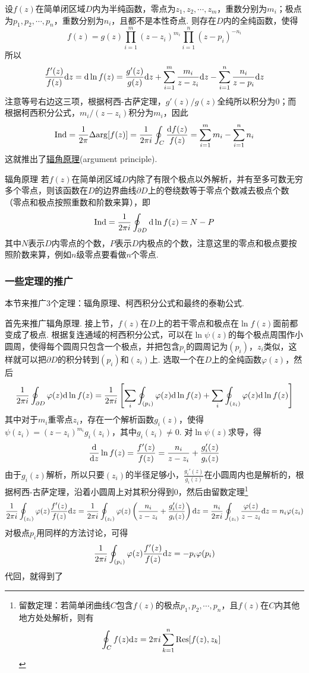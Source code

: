 \documentclass[main.tex]{subfiles}
\begin{document}
设\(f(z)\)在简单闭区域\(D\)内为半纯函数，零点为\(z_1,z_2,\cdots,z_m\)，重数分别为\(m_i\)；极点为\(p_1, p_2, \cdots, p_n\)，重数分别为\(n_i\)，且都不是本性奇点. 则存在\(D\)内的全纯函数，使得
\[f(z) = g(z)\prod_{i=1}^{m}(z-z_i)^{m_i}\prod_{i=1}^{n}(z-p_i)^{-n_i}\]
所以
\[\frac{f'(z)}{f(z)}{\rm d}z = {\rm d}\ln f(z) = \frac{g'(z)}{g(z)}{\rm d}z + \sum_{i=1}^{m}\frac{m_i}{z-z_i}{\rm d}z - \sum_{i=1}^{n} \frac{n_i}{z-p_i} {\rm d}z\]
注意等号右边这三项，根据柯西-古萨定理，\(g'(z)/g(z)\)全纯所以积分为\(0\)；而根据柯西积分公式，\(m_i/(z-z_i)\)积分为\(m_i\)，因此
\[{\rm Ind} = \frac{1}{2\pi}\Delta{\rm arg} [f(z)] = \frac{1}{2\pi i}\oint_{C}\frac{{\rm d}f(z)}{f(z)} = \sum_{i=1}^{m}m_i - \sum_{i=1}^{n}n_i\]
这就推出了\uline{辐角原理}(argument principle).

\begin{theorem}{辐角原理}
    若\(f(z)\)在简单闭区域\(D\)内除了有限个极点以外解析，并有至多可数无穷多个零点，则该函数在\(D\)的边界曲线\(\partial D\)上的卷绕数等于零点个数减去极点个数（零点和极点按照重数和阶数来算），即
    \[{\rm Ind} = \frac{1}{2\pi i}\oint_{\partial D}{\rm d}\ln f(z) = N-P\]
    其中\(N\)表示\(D\)内零点的个数，\(P\)表示\(D\)内极点的个数，注意这里的零点和极点要按照阶数来算，例如\(n\)级零点要看做\(n\)个零点.
\end{theorem}

\subsubsection{一些定理的推广}

本节来推广3个定理：辐角原理、柯西积分公式和最终的泰勒公式.

首先来推广辐角原理. 接上节，\(f(z)\)在\(D\)上的若干零点和极点在\(\ln f(z)\)面前都变成了极点. 根据复连通域的柯西积分公式，可以在\(\ln\psi(z)\)的每个极点周围作小圆周，使得每个圆周只包含一个极点，并把包含\(p_i\)的圆周记为\((p_i)\)，\(z_i\)类似，这样就可以把\(\partial D\)的积分转到\((p_i)\)和\((z_i)\)上. 选取一个在\(D\)上的全纯函数\(\varphi(z)\)，然后
\[\frac{1}{2\pi i}\oint_{\partial D}\varphi(z){\rm d}\ln f(z) = \frac{1}{2\pi i}\left[\sum_{i}\oint_{(p_i)}\varphi(z){\rm d}\ln f(z)+\sum_{i}\oint_{(z_i)}\varphi(z){\rm d}\ln f(z)\right]\]
其中对于\(m_i\)重零点\(z_i\)，存在一个解析函数\(g_i(z)\)，使得\(\psi(z_i) = (z-z_i)^{m_i}g_i(z_i)\)，其中\(g_i(z_i)\neq 0\). 对\(\ln\psi(z)\)求导，得
\[\frac{{\rm d}}{{\rm d}z}\ln f(z) = \frac{f'(z)}{f(z)} = \frac{n_i}{z-z_i}+\frac{g_i'(z)}{g_i(z)}\]
由于\(g_i(z)\)解析，所以只要\((z_i)\)的半径足够小，\(\frac{g_i'(z)}{g_i(z)}\)在小圆周内也是解析的，根据柯西-古萨定理，沿着小圆周上对其积分得到\(0\)，然后由留数定理\footnote{留数定理：若简单闭曲线\(C\)包含\(f(z)\)的极点\(p_1, p_2, \cdots, p_n\)，且\(f(z)\)在\(C\)内其他地方处处解析，则有
\[\oint_C f(z){\rm d}z = 2\pi i\sum_{k=1}^{n}{\rm Res}[f(z),z_k]\]}
\[\frac{1}{2\pi i}\oint_{(z_i)}\varphi(z)\frac{f'(z)}{f(z)}{\rm d}z = \frac{1}{2\pi i}\oint_{(z_i)}\varphi(z)\left(\frac{n_i}{z-z_i}+\frac{g_i'(z)}{g_i(z)}\right){\rm d}z = \frac{n_i}{2\pi i}\oint_{(z_i)}\frac{\varphi(z)}{z-z_i}{\rm d}z = n_i\varphi(z_i)\]
对极点\(p_i\)用同样的方法讨论，可得
\[\frac{1}{2 \pi i}\oint_{(p_i)}\varphi(z)\frac{f'(z)}{f(z)}{\rm d}z = -p_i\varphi(p_i)\]
代回，就得到了
\end{document}

